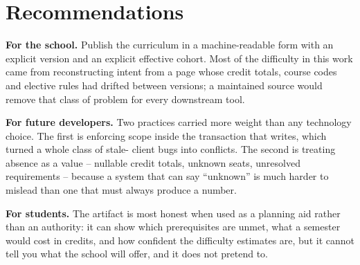 \section{Recommendations}

\textbf{For the school.} Publish the curriculum in a machine-readable form with an explicit version
and an explicit effective cohort. Most of the difficulty in this work came from reconstructing
intent from a page whose credit totals, course codes and elective rules had drifted between
versions; a maintained source would remove that class of problem for every downstream tool.

\textbf{For future developers.} Two practices carried more weight than any technology choice. The
first is enforcing scope inside the transaction that writes, which turned a whole class of stale-
client bugs into conflicts. The second is treating absence as a value -- nullable credit totals,
unknown seats, unresolved requirements -- because a system that can say ``unknown'' is much harder
to mislead than one that must always produce a number.

\textbf{For students.} The artifact is most honest when used as a planning aid rather than an
authority: it can show which prerequisites are unmet, what a semester would cost in credits, and how
confident the difficulty estimates are, but it cannot tell you what the school will offer, and it
does not pretend to.
